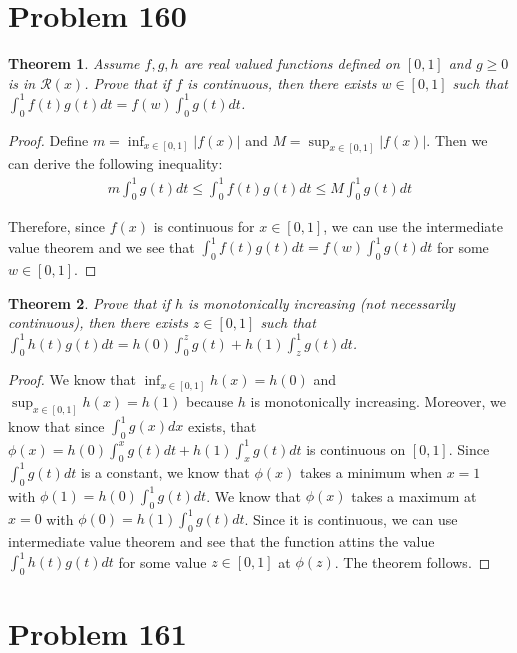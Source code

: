 \documentclass[psamsfonts]{amsart}
\newtheorem{thm}{Theorem}[section]
\theoremstyle{definition}
\theoremstyle{remark}
\numberwithin{equation}{section}
\begin{document}
\section{Problem 160}

\begin{thm}
Assume $f,g,h$ are real valued functions defined on $[0,1]$ and $g \geq 0$ is in $\mathscr{R}(x)$. Prove that if $f$ is continuous, then there exists $w \in [0,1]$ such that $\int_0^1 f(t) g(t) dt = f(w) \int_0^1 g(t) dt$.
\end{thm}

\begin{proof}
Define $m = \inf_{x \in [0,1]} |f(x)|$ and $M = \sup_{x \in [0,1]} |f(x)|$. Then we can derive the following inequality:
\begin{eqnarray}
m \int_0^1 g(t)dt \leq \int_0^1 f(t) g(t) dt \leq M \int_0^1 g(t) dt 
\end{eqnarray}

Therefore, since $f(x)$ is continuous for $x \in [0,1]$, we can use the intermediate value theorem and we see that $\int_0^1 f(t) g(t) dt = f(w) \int_0^1 g(t) dt$ for some $w \in [0,1]$. 
\end{proof}

\begin{thm}
Prove that if $h$ is monotonically increasing (not necessarily continuous), then there exists $z \in [0,1]$ such that $\int_0^1 h(t) g(t) dt = h(0) \int_0^z g(t) + h(1) \int_z^1 g(t) dt$. 
\end{thm}

\begin{proof}
We know that $\inf_{x \in [0,1]} h(x) = h(0)$ and $\sup_{x \in [0,1]} h(x) = h(1)$ because $h$ is monotonically increasing. Moreover, we know that since $\int_0^1 g(x) dx$ exists, that $\phi(x) = h(0) \int_0^x g(t) dt + h(1) \int_x^1 g(t) dt$ is continuous on $[0,1]$. Since $\int_0^1 g(t) dt$ is a constant, we know that $\phi(x)$ takes a minimum when $x = 1$ with $\phi(1) = h(0) \int_0^1 g(t) dt$. We know that $\phi(x)$ takes a maximum at $x = 0$ with $\phi(0) = h(1) \int_0^1 g(t) dt$. Since it is continuous, we can use intermediate value theorem and see that the function attins the value $\int_0^1 h(t) g(t) dt$ for some value $z \in [0,1]$  at $\phi(z)$. The theorem follows.
\end{proof}

\section{Problem 161}
\end{document}
